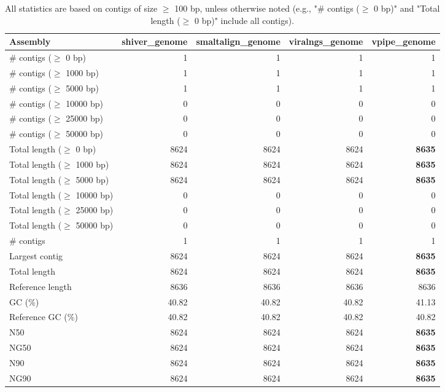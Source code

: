 \documentclass[12pt,a4paper]{article}
\begin{document}
\begin{table}[ht]
\begin{center}
\caption{All statistics are based on contigs of size $\geq$ 100 bp, unless otherwise noted (e.g., "\# contigs ($\geq$ 0 bp)" and "Total length ($\geq$ 0 bp)" include all contigs).}
\begin{tabular}{|l*{4}{|r}|}
\hline
Assembly & shiver\_genome & smaltalign\_genome & viralngs\_genome & vpipe\_genome \\ \hline
\# contigs ($\geq$ 0 bp) & 1 & 1 & 1 & 1 \\ \hline
\# contigs ($\geq$ 1000 bp) & 1 & 1 & 1 & 1 \\ \hline
\# contigs ($\geq$ 5000 bp) & 1 & 1 & 1 & 1 \\ \hline
\# contigs ($\geq$ 10000 bp) & 0 & 0 & 0 & 0 \\ \hline
\# contigs ($\geq$ 25000 bp) & 0 & 0 & 0 & 0 \\ \hline
\# contigs ($\geq$ 50000 bp) & 0 & 0 & 0 & 0 \\ \hline
Total length ($\geq$ 0 bp) & 8624 & 8624 & 8624 & {\bf 8635} \\ \hline
Total length ($\geq$ 1000 bp) & 8624 & 8624 & 8624 & {\bf 8635} \\ \hline
Total length ($\geq$ 5000 bp) & 8624 & 8624 & 8624 & {\bf 8635} \\ \hline
Total length ($\geq$ 10000 bp) & 0 & 0 & 0 & 0 \\ \hline
Total length ($\geq$ 25000 bp) & 0 & 0 & 0 & 0 \\ \hline
Total length ($\geq$ 50000 bp) & 0 & 0 & 0 & 0 \\ \hline
\# contigs & 1 & 1 & 1 & 1 \\ \hline
Largest contig & 8624 & 8624 & 8624 & {\bf 8635} \\ \hline
Total length & 8624 & 8624 & 8624 & {\bf 8635} \\ \hline
Reference length & 8636 & 8636 & 8636 & 8636 \\ \hline
GC (\%) & 40.82 & 40.82 & 40.82 & 41.13 \\ \hline
Reference GC (\%) & 40.82 & 40.82 & 40.82 & 40.82 \\ \hline
N50 & 8624 & 8624 & 8624 & {\bf 8635} \\ \hline
NG50 & 8624 & 8624 & 8624 & {\bf 8635} \\ \hline
N90 & 8624 & 8624 & 8624 & {\bf 8635} \\ \hline
NG90 & 8624 & 8624 & 8624 & {\bf 8635} \\ \hline

\end{tabular}
\end{center}
\end{table}
\end{document}
